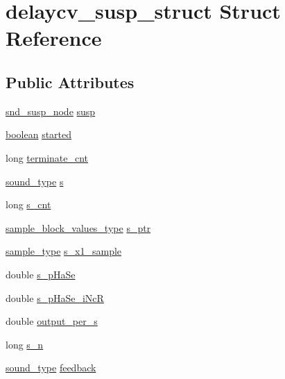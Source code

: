 \hypertarget{structdelaycv__susp__struct}{}\section{delaycv\+\_\+susp\+\_\+struct Struct Reference}
\label{structdelaycv__susp__struct}
\subsection*{Public Attributes}
\begin{DoxyCompactItemize}
\item 
\hyperlink{sound_8h_a6b268203688a934bd798ceb55f85d4c0}{snd\+\_\+susp\+\_\+node} \hyperlink{structdelaycv__susp__struct_ace9ac6e69436620e627aea8d6e0f9d0b}{susp}
\item 
\hyperlink{cext_8h_a7670a4e8a07d9ebb00411948b0bbf86d}{boolean} \hyperlink{structdelaycv__susp__struct_af5e609da5738bf11b247b48472141aa3}{started}
\item 
long \hyperlink{structdelaycv__susp__struct_a65b4f54e270b399d5ee5e71e1f417936}{terminate\+\_\+cnt}
\item 
\hyperlink{sound_8h_a792cec4ed9d6d636d342d9365ba265ea}{sound\+\_\+type} \hyperlink{structdelaycv__susp__struct_ac4a8cdd94d41d18c86347950ac48c43a}{s}
\item 
long \hyperlink{structdelaycv__susp__struct_a975929a7646b625e30863eb3912a1ba6}{s\+\_\+cnt}
\item 
\hyperlink{sound_8h_a83d17f7b465d1591f27cd28fc5eb8a03}{sample\+\_\+block\+\_\+values\+\_\+type} \hyperlink{structdelaycv__susp__struct_a26c700f1d49d396d6a8cdbb676fb8ffd}{s\+\_\+ptr}
\item 
\hyperlink{sound_8h_a3a9d1d4a1c153390d2401a6e9f71b32c}{sample\+\_\+type} \hyperlink{structdelaycv__susp__struct_ac02932713af9536ab6919092ea812e0f}{s\+\_\+x1\+\_\+sample}
\item 
double \hyperlink{structdelaycv__susp__struct_a5e827bb28549f43fb0b9a14236f8b0fe}{s\+\_\+p\+Ha\+Se}
\item 
double \hyperlink{structdelaycv__susp__struct_af7f6967009dca96c87d66a0dea636a90}{s\+\_\+p\+Ha\+Se\+\_\+i\+NcR}
\item 
double \hyperlink{structdelaycv__susp__struct_a889a7a6da1172ba04e82ef4ced284536}{output\+\_\+per\+\_\+s}
\item 
long \hyperlink{structdelaycv__susp__struct_a608a1827479162db71a686916de9d25a}{s\+\_\+n}
\item 
\hyperlink{sound_8h_a792cec4ed9d6d636d342d9365ba265ea}{sound\+\_\+type} \hyperlink{structdelaycv__susp__struct_a27f5491dcf88af0e498a9b9e7769b520}{feedback}

\end{DoxyCompactItemize}
